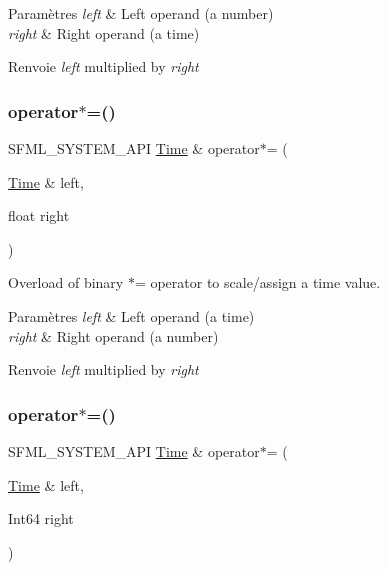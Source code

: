\begin{DoxyParams}{Paramètres}
{\em left} & Left operand (a number) \\
\hline
{\em right} & Right operand (a time)\\
\hline
\end{DoxyParams}
\begin{DoxyReturn}{Renvoie}
{\itshape left} multiplied by {\itshape right} 
\end{DoxyReturn}
\mbox{\label{classsf_1_1Time_a8996b6a6fcb8f3854b486b8e43949b50}} 
\subsubsection{\texorpdfstring{operator$\ast$=()}{operator*=()}\hspace{0.1cm}{\footnotesize\ttfamily [1/2]}}
{\footnotesize\ttfamily S\+F\+M\+L\+\_\+\+S\+Y\+S\+T\+E\+M\+\_\+\+A\+PI \hyperlink{classsf_1_1Time}{Time} \& operator$\ast$= (\begin{DoxyParamCaption}\item[{\hyperlink{classsf_1_1Time}{Time} \&}]{left,  }\item[{float}]{right }\end{DoxyParamCaption})\hspace{0.3cm}{\ttfamily [related]}}



Overload of binary $\ast$= operator to scale/assign a time value. 


\begin{DoxyParams}{Paramètres}
{\em left} & Left operand (a time) \\
\hline
{\em right} & Right operand (a number)\\
\hline
\end{DoxyParams}
\begin{DoxyReturn}{Renvoie}
{\itshape left} multiplied by {\itshape right} 
\end{DoxyReturn}
\mbox{\label{classsf_1_1Time_a6656a0a1a1802009a72d93fbba61f24a}} 
\subsubsection{\texorpdfstring{operator$\ast$=()}{operator*=()}\hspace{0.1cm}{\footnotesize\ttfamily [2/2]}}
{\footnotesize\ttfamily S\+F\+M\+L\+\_\+\+S\+Y\+S\+T\+E\+M\+\_\+\+A\+PI \hyperlink{classsf_1_1Time}{Time} \& operator$\ast$= (\begin{DoxyParamCaption}\item[{\hyperlink{classsf_1_1Time}{Time} \&}]{left,  }\item[{Int64}]{right }\end{DoxyParamCaption})\hspace{0.3cm}{\ttfamily [related]}}



